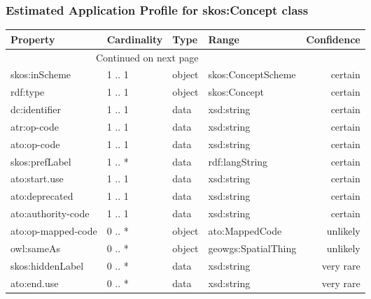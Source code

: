 \documentclass[10pt,a4paper,titlepage,final]{article}
\begin{document}
\subsubsection{Estimated Application Profile for skos:Concept class}
\begin{tabularx}{\textwidth}{lllXr}
\toprule
           Property & Cardinality &    Type &                Range & Confidence \\
\midrule
\endhead
\midrule
\multicolumn{3}{r}{{Continued on next page}} \\
\midrule
\endfoot

\bottomrule
\endlastfoot
      skos:inScheme &      1 .. 1 &  object &   skos:ConceptScheme &    certain \\
           rdf:type &      1 .. 1 &  object &         skos:Concept &    certain \\
      dc:identifier &      1 .. 1 &    data &           xsd:string &    certain \\
        atr:op-code &      1 .. 1 &    data &           xsd:string &    certain \\
        ato:op-code &      1 .. 1 &    data &           xsd:string &    certain \\
     skos:prefLabel &      1 .. * &    data &       rdf:langString &    certain \\
      ato:start.use &      1 .. 1 &    data &           xsd:string &    certain \\
     ato:deprecated &      1 .. 1 &    data &           xsd:string &    certain \\
 ato:authority-code &      1 .. 1 &    data &           xsd:string &    certain \\
 ato:op-mapped-code &      0 .. * &  object &       ato:MappedCode &   unlikely \\
         owl:sameAs &      0 .. * &  object &  geowgs:SpatialThing &   unlikely \\
   skos:hiddenLabel &      0 .. * &    data &           xsd:string &  very rare \\
        ato:end.use &      0 .. * &    data &           xsd:string &  very rare \\
\end{tabularx}
\end{document}

